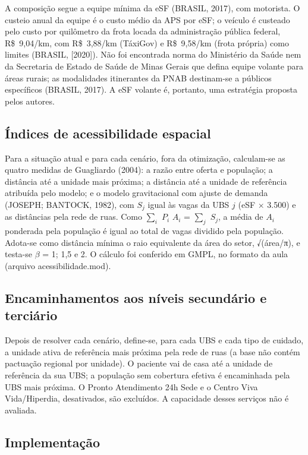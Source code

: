 \documentclass[11pt,a4paper]{article}
\begin{document}
A composição segue a equipe mínima da eSF (BRASIL, 2017), com motorista. O custeio anual da equipe é o custo médio da APS por eSF; o veículo é custeado pelo custo por quilômetro da frota locada da administração pública federal, R\$~9,04/km, com R\$~3,88/km (TáxiGov) e R\$~9,58/km (frota própria) como limites (BRASIL, [2020]). Não foi encontrada norma do Ministério da Saúde nem da Secretaria de Estado de Saúde de Minas Gerais que defina equipe volante para áreas rurais; as modalidades itinerantes da PNAB destinam-se a públicos específicos (BRASIL, 2017). A eSF volante é, portanto, uma estratégia proposta pelos autores.

\subsection{Índices de acessibilidade espacial}\label{sec:3.9}

Para a situação atual e para cada cenário, fora da otimização, calculam-se as quatro medidas de Guagliardo (2004): a razão entre oferta e população; a distância até a unidade mais próxima; a distância até a unidade de referência atribuída pelo modelo; e o modelo gravitacional com ajuste de demanda (JOSEPH; BANTOCK, 1982), com $S_{j}$ igual às vagas da UBS $j$ (eSF × 3.500) e as distâncias pela rede de ruas. Como $\textstyle\sum_{i}$ $P_{i}$ $A_{i}$ = $\textstyle\sum_{j}$ $S_{j}$, a média de $A_{i}$ ponderada pela população é igual ao total de vagas dividido pela população. Adota-se como distância mínima o raio equivalente da área do setor, √(área/π), e testa-se $\beta $ = 1; 1,5 e 2. O cálculo foi conferido em GMPL, no formato da aula (arquivo acessibilidade.mod).

\subsection{Encaminhamentos aos níveis secundário e terciário}\label{sec:3.10}

Depois de resolver cada cenário, define-se, para cada UBS e cada tipo de cuidado, a unidade ativa de referência mais próxima pela rede de ruas (a base não contém pactuação regional por unidade). O paciente vai de casa até a unidade de referência da sua UBS; a população sem cobertura efetiva é encaminhada pela UBS mais próxima. O Pronto Atendimento 24h Sede e o Centro Viva Vida/Hiperdia, desativados, são excluídos. A capacidade desses serviços não é avaliada.

\subsection{Implementação}\label{sec:3.11}
\end{document}
